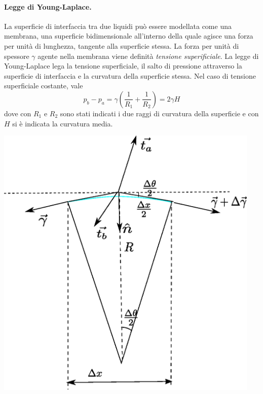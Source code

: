 \paragraph{Legge di Young-Laplace.}
\begin{minipage}{0.60\textwidth}
La superficie di interfaccia tra due liquidi può essere modellata come una membrana, una superficie bidimensionale all'interno della quale agisce una forza per unità di lunghezza, tangente alla superficie stessa. La forza per unità di spessore $\gamma$ agente nella membrana viene definità \textit{tensione superificiale}. La legge di Young-Laplace lega la tensione superficiale, il salto di pressione attraverso la superficie di interfaccia e la curvatura della superficie stessa. Nel caso di tensione superficiale costante, vale
\begin{equation}
  p_b - p_a = \gamma \displaystyle\left( \frac{1}{R_1} + \frac{1}{R_2} \right) = 2 \gamma H
\end{equation}
 dove con $R_1$ e $R_2$ sono stati indicati i due raggi di curvatura della superficie e con $H$ si è indicata la curvatura media.
\end{minipage}
%
\begin{minipage}{0.40\textwidth}
  \begin{center}
    \includegraphics[width=0.95\textwidth]{./fig/laplaceYoung2Ddim.eps}
  \end{center}
\end{minipage}

